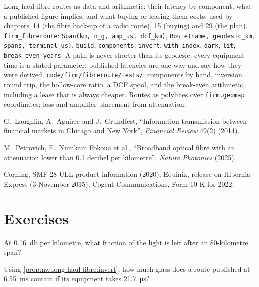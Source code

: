 \begin{build}
 Long-haul fibre routes as data and arithmetic: their latency by component, what a published figure implies, and what buying or
leasing them costs; used by chapters~14 (the fibre back-up of a radio route), 15 (buying) and 29 (the plan).
 \texttt{firm\_fibreroute}: \texttt{Span(km, n\_g, amp\_us, dcf\_km)}, \texttt{Route(name, geodesic\_km, spans, terminal\_us)},
\texttt{build}, \texttt{components}, \texttt{invert}, \texttt{with\_index}, \texttt{dark}, \texttt{lit}, \texttt{break\_even\_years}.
 A path is never shorter than its geodesic; every equipment time is a stated parameter; published latencies are one-way and say
how they were derived.
 \texttt{code/firm/fibreroute/tests/}: components by hand, inversion round trip, the hollow-core ratio, a DCF spool, and
the break-even arithmetic, including a lease that is always cheaper.
 Routes as polylines over \texttt{firm.geomap} coordinates; loss and amplifier placement from attenuation.
\end{build}

\begin{omsources}
\item G.~Laughlin, A.~Aguirre and J.~Grundfest, ``Information transmission between financial markets in Chicago and New York'', \emph{Financial
Review} 49(2) (2014).
\item M.~Petrovich, E.~Numkam Fokoua et al., ``Broadband optical fibre with an attenuation lower than 0.1 decibel per kilometre'', \emph{Nature
Photonics} (2025).
\item Corning, SMF-28 ULL product information (2020); Equinix, release on Hibernia Express (3 November 2015); Cogent Communications, Form 10-K
for 2022.
\end{omsources}

\section{Exercises}

\begin{exercise}[$\star$]\label{exo:nw:long-haul-fibre:1}
At \qty{0.16}{\decibel} per kilometre, what fraction of the light is left after an 80-kilometre span?
\end{exercise}

\begin{exercise}[$\star$]\label{exo:nw:long-haul-fibre:2}
Using \cref{prop:nw:long-haul-fibre:invert}, how much glass does a route published at \qty{6.55}{\milli\second} contain if its equipment takes
\qty{21.7}{\micro\second}?
\end{exercise}

